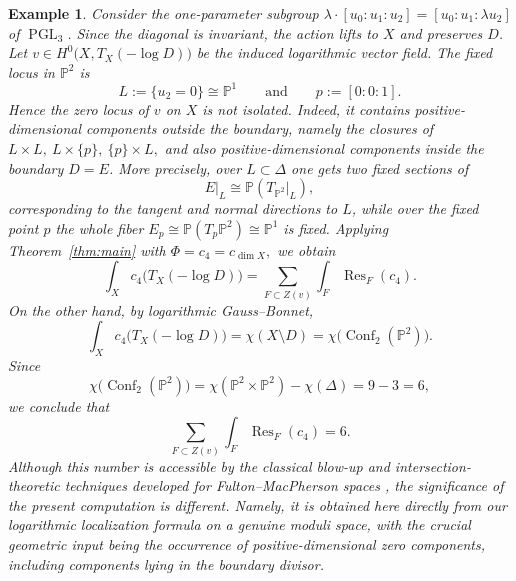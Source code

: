 \documentclass[12pt,a4paper,dvipsnames,x11names]{amsart}
\numberwithin{equation}{section}
\theoremstyle{plain}
\newtheorem{example}[theorem]{Example}
\theoremstyle{definition}
\theoremstyle{remark}
\begin{document}
\begin{example}
Consider the one-parameter subgroup
$
\lambda\cdot [u_0:u_1:u_2]=[u_0:u_1:\lambda u_2]
$
of $\operatorname{PGL}_3$. Since the diagonal is invariant, the action lifts to $X$ and preserves $D$. Let
$
v\in H^0\bigl(X,T_X(-\log D)\bigr)
$
be the induced logarithmic vector field.
The fixed locus in $\mathbb P^2$ is
$$
L:=\{u_2=0\}\cong \mathbb P^1
\qquad\text{and}\qquad
p:=[0:0:1].
$$
Hence the zero locus of $v$ on $X$ is not isolated. Indeed, it contains positive-dimensional components outside the boundary, namely the closures of
$
L\times L,\ L\times\{p\},\ \{p\}\times L,
$
and also positive-dimensional components inside the boundary $D=E$. More precisely, over $L\subset \Delta$ one gets two fixed sections of
$$
E|_L\cong \mathbb P(T_{\mathbb P^2}|_L),
$$
corresponding to the tangent and normal directions to $L$, while over the fixed point $p$ the whole fiber
$
E_p\cong \mathbb P(T_p\mathbb P^2)\cong \mathbb P^1
$
is fixed.
Applying Theorem~\ref{thm:main} with
$
\Phi=c_4=c_{\dim X},
$
we obtain
$$
\int_X c_4\bigl(T_X(-\log D)\bigr)
=
\sum_{F\subset Z(v)} \int_F  \operatorname{Res}_F(c_4).
$$
On the other hand, by logarithmic Gauss--Bonnet,
$$
\int_X c_4\bigl(T_X(-\log D)\bigr)
=
\chi(X\setminus D)
=
\chi\bigl(\operatorname{Conf}_2(\mathbb P^2)\bigr).
$$
Since
$$
\chi\bigl(\operatorname{Conf}_2(\mathbb P^2)\bigr)
=
\chi(\mathbb P^2\times \mathbb P^2)-\chi(\Delta)
=
9-3
=
6,
$$
we conclude that
$$
\sum_{F\subset Z(v)} \int_F \operatorname{Res}_F(c_4)=6.
$$
Although this number is accessible by the classical blow-up and intersection-theoretic techniques developed for Fulton--MacPherson spaces \cite{FultonMacPherson94,Petersen17,Aluffi10}, the significance of the present computation is different. Namely, it is obtained here directly from our logarithmic localization formula on a genuine moduli space, with the crucial geometric input being the occurrence of positive-dimensional zero components, including components lying in the boundary divisor.
\end{example}
\end{document}
